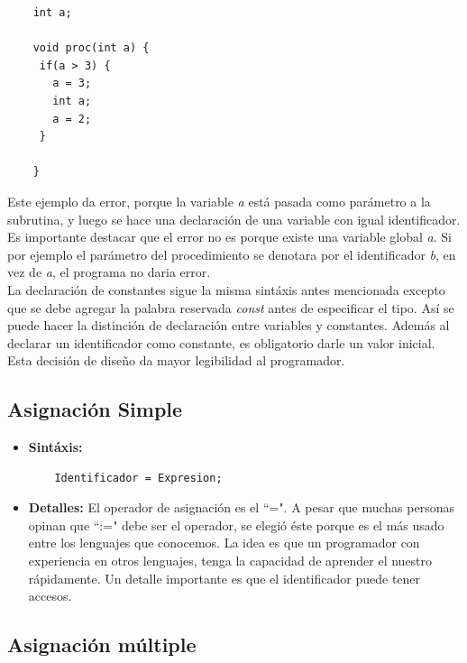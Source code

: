 \documentclass[11pt, spanish]{report}
\begin{document}
\begin{itemize}
  \begin{verbatim}
    int a;
    
    void proc(int a) {
     if(a > 3) {
       a = 3;
       int a;
       a = 2;
     }
     
    }    
  \end{verbatim}

  Este ejemplo da error, porque la variable \emph{a} est\'a pasada como par\'ametro a la subrutina, y luego se hace una declaraci\'on de una variable con igual 
  identificador. Es importante destacar que el error no es porque existe una variable global \emph{a}. Si por ejemplo el par\'ametro del procedimiento se denotara
  por el identificador \emph{b}, en vez de \emph{a}, el programa no daria error.\\

  La declaraci\'on de constantes sigue la misma sint\'axis antes mencionada excepto que se debe agregar la palabra reservada \emph{const} antes de especificar
  el tipo. As\'i se puede hacer la distinci\'on de declaraci\'on entre variables y constantes. Adem\'as al declarar un identificador como constante, es obligatorio
  darle un valor inicial. Esta decisi\'on de dise\~no da mayor legibilidad al programador.\\
\end{itemize}

\subsection{Asignaci\'on Simple}

\begin{itemize}
\item \textbf{Sint\'axis:}

  \begin{verbatim} 
    Identificador = Expresion;
  \end{verbatim} 

\item \textbf{Detalles:}
  El operador de asignaci\'on es el ``=". A pesar que muchas personas opinan que ``:=" debe ser el operador, se elegi\'o \'este porque es el m\'as usado entre
  los lenguajes que conocemos. La idea es que un programador con experiencia en otros lenguajes, tenga la capacidad de aprender el nuestro r\'apidamente. Un detalle importante es que el identificador puede tener accesos.\\
\end{itemize}

\subsection{Asignaci\'on m\'ultiple}
\end{document}
